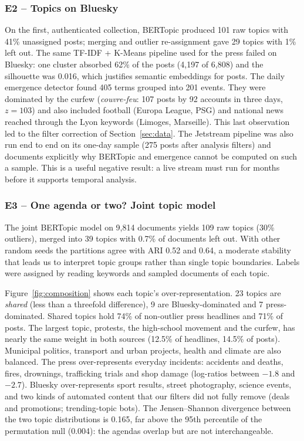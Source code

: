 \documentclass[pdflatex,sn-mathphys-num]{sn-jnl}
\begin{document}
\subsubsection{E2 -- Topics on Bluesky}

On the first, authenticated collection, BERTopic produced 101 raw topics with 41\% unassigned posts; merging and outlier re-assignment gave 29 topics with 1\% left out. The same TF-IDF + K-Means pipeline used for the press failed on Bluesky: one cluster absorbed 62\% of the posts (4,197 of 6,808) and the silhouette was 0.016, which justifies semantic embeddings for posts. The daily emergence detector found 405 terms grouped into 201 events. They were dominated by the curfew (\emph{couvre-feu}: 107 posts by 92 accounts in three days, $z=103$) and also included football (Europa League, PSG) and national news reached through the Lyon keywords (Limoges, Marseille). This last observation led to the filter correction of Section~\ref{sec:data}. The Jetstream pipeline was also run end to end on its one-day sample (275 posts after analysis filters) and documents explicitly why BERTopic and emergence cannot be computed on such a sample. This is a useful negative result: a live stream must run for months before it supports temporal analysis.

\subsubsection{E3 -- One agenda or two? Joint topic model}

The joint BERTopic model on 9,814 documents yields 109 raw topics (30\% outliers), merged into 39 topics with 0.7\% of documents left out. With other random seeds the partitions agree with ARI 0.52 and 0.64, a moderate stability that leads us to interpret topic groups rather than single topic boundaries. Labels were assigned by reading keywords and sampled documents of each topic.

Figure~\ref{fig:composition} shows each topic's over-representation. 23 topics are \emph{shared} (less than a threefold difference), 9 are Bluesky-dominated and 7 press-dominated. Shared topics hold 74\% of non-outlier press headlines and 71\% of posts. The largest topic, protests, the high-school movement and the curfew, has nearly the same weight in both sources (12.5\% of headlines, 14.5\% of posts). Municipal politics, transport and urban projects, health and climate are also balanced. The press over-represents everyday incidents: accidents and deaths, fires, drownings, trafficking trials and shop damage (log-ratios between $-1.8$ and $-2.7$). Bluesky over-represents sport results, street photography, science events, and two kinds of automated content that our filters did not fully remove (deals and promotions; trending-topic bots). The Jensen--Shannon divergence between the two topic distributions is 0.165, far above the 95th percentile of the permutation null (0.004): the agendas overlap but are not interchangeable.
\end{document}
